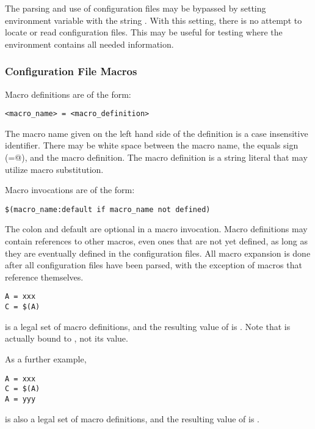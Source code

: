 The parsing and use of configuration files may be bypassed by
setting environment variable  with the
string .
With this setting, there is no attempt to locate or read
configuration files.
This may be useful for testing where the environment contains
all needed information.

\subsubsection{\label{sec:Config-File-Macros}Configuration File Macros} 


Macro definitions are of the form:
\begin{verbatim}
<macro_name> = <macro_definition>
\end{verbatim}

The macro name given on the left hand side of the definition is
a case insensitive identifier.
There may be white space between the macro name, the
equals sign (\verb@=@), and the macro definition.
The macro definition is a string literal that may utilize macro substitution.

Macro invocations are of the form: 
\begin{verbatim}
$(macro_name:default if macro_name not defined)
\end{verbatim}

The colon and default are optional in a macro invocation.
Macro definitions may contain references to other macros, even ones
that are not yet defined, as long as they are eventually defined in
the configuration files.
All macro expansion is done after all configuration files have been parsed,
with the exception of macros that reference themselves.

\begin{verbatim}
A = xxx
C = $(A) 
\end{verbatim}
is a legal set of macro definitions, and the resulting value of 
 is
.
Note that
 is actually bound to 
, not its value.

As a further example,
\begin{verbatim}
A = xxx
C = $(A)
A = yyy
\end{verbatim}
is also a legal set of macro definitions, and the resulting value of
 is .  

